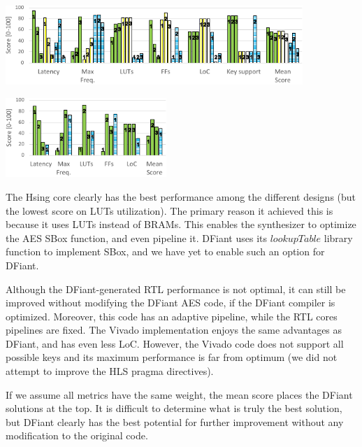 \begin{table}[t!]
  \begin{minipage}[b][3.8cm][b]{0.64\linewidth}
  	\centering
    \includegraphics[height=3cm]{graphics/AES_Compare.pdf} 
    \label{fig:AES_Compare_Graph}
  \end{minipage}
  \begin{minipage}[b][3.8cm][b]{0.35\linewidth}
    \centering
    \includegraphics[height=3cm]{graphics/FP_Compare.pdf} 
    \label{fig:FP_Compare_Graph}
  \end{minipage}
\end{table}

The Hsing core clearly has the best performance among the different designs (but the lowest score on LUTs utilization). The primary reason it achieved this is because it uses LUTs instead of BRAMs. This enables the synthesizer to optimize the AES SBox function, and even pipeline it. DFiant uses its $lookupTable$ library function to implement SBox, and we have yet to enable such an option for DFiant. 

Although the DFiant-generated RTL performance is not optimal, it can still  be improved without modifying the DFiant AES code, if the DFiant compiler is optimized. Moreover, this code has an adaptive pipeline, while the RTL cores pipelines are fixed. The Vivado implementation enjoys the same advantages as DFiant, and has even less LoC. However, the Vivado code does not support all possible keys and its maximum performance is far from optimum (we did not attempt to improve the HLS pragma directives).

If we assume all metrics have the same weight, the mean score places the DFiant solutions at the top. It is difficult to determine what is truly the best solution, but DFiant clearly has the best potential for further improvement without any modification to the original code.

